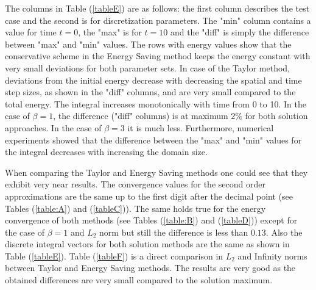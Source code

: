 \documentclass[%
 aip,
cp,  %
 amsmath,amssymb,%
 reprint,%
]{revtex4-2}
\newcommand{\rf}[1]{(\ref{#1})}
\begin{document}
The columns in Table \rf{tableE} are as follows: the first column describes the test case and the second is for discretization parameters.
The "min" column contains a value for time $t=0$, the "max" is for $t=10$ and the "diff" is simply the difference between "max" and "min" values. The rows with energy values show that the conservative scheme in the Energy Saving method keeps the energy constant with very small deviations for both parameter sets. In case of the Taylor method, deviations from the initial energy decrease with decreasing the spatial and time step sizes, as shown in the "diff" columns, and are very small compared to the total energy. The integral increases monotonically with time from 0 to 10. In the case of $\beta = 1$, the difference ("diff" columns) is at maximum $2\%$ for both solution approaches. In the case of $\beta = 3$ it is much less. Furthermore, numerical experiments showed that the difference between the "max" and "min" values for the integral decreases with increasing the domain size.

When comparing the Taylor and Energy Saving methods one could see that they exhibit very near results. The convergence values for the second order approximations are the same up to the first digit after the decimal point (see Tables \rf{table:A} and  \rf{tableC}). The same holds true for the energy convergence of both methods (see Tables \rf{table:B} and  \rf{tableD}) except for the case of $\beta = 1$ and $L_2$ norm but still the difference is less than $0.13$. Also the discrete integral vectors for both solution methods are the same as shown in Table \rf{tableE}. Table \rf{tableF} is a direct comparison in $L_2$ and Infinity norms between Taylor and Energy Saving methods. The results are very good as the obtained differences are very small compared to the solution maximum.
\end{document}
